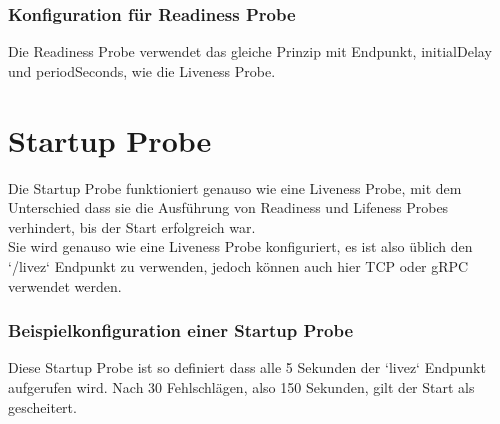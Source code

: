 \subsubsection{Konfiguration für Readiness Probe}
Die Readiness Probe verwendet das gleiche Prinzip mit Endpunkt, initialDelay und periodSeconds, wie die Liveness Probe.

\newpage
\section{Startup Probe}
Die Startup Probe funktioniert genauso wie eine Liveness Probe, mit dem Unterschied dass sie die Ausführung von Readiness und Lifeness Probes verhindert, bis der Start erfolgreich war.\\
Sie wird genauso wie eine Liveness Probe konfiguriert, es ist also üblich den `/livez` Endpunkt zu verwenden, jedoch können auch hier TCP oder gRPC verwendet werden.
\subsubsection{Beispielkonfiguration einer Startup Probe}
Diese Startup Probe ist so definiert dass alle 5 Sekunden der `livez` Endpunkt aufgerufen wird. Nach 30 Fehlschlägen, also 150 Sekunden, gilt der Start als gescheitert.

